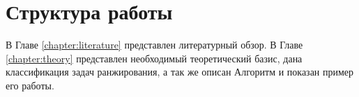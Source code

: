 
\section*{Структура работы}
В Главе \ref{chapter:literature} представлен литературный обзор. В Главе \ref{chapter:theory} представлен необходимый теоретический базис, дана классификация задач ранжирования, а так же описан Алгоритм и показан пример его работы.
